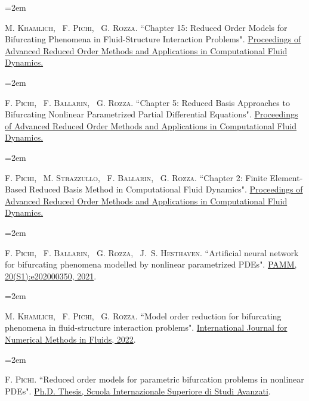 \documentclass{scrartcl}
\newcommand{\MarginText}[1]{\marginpar{\raggedleft\itshape\small#1}} %
\newlength{\datebox}\settowidth{\datebox}{Spring 2011} %
\newcommand{\NewEntry}[3]{\noindent\hangindent=2em\hangafter=0 \parbox{\datebox}{\small \textit{#1}}\hspace{1.5em} #2 #3 %
\vspace{0.5em}} %
\newcommand{\Description}[1]{\hangindent=2em\hangafter=0\noindent\raggedright\footnotesize{#1}\par\normalsize\vspace{1em}} %
\begin{document}
\begin{cv}{}
\Description{\MarginText{[11]}M. \textsc{Khamlich}, ~F. \textsc{Pichi}, ~G. \textsc{Rozza.} {\color{blue} ``Chapter 15: Reduced Order Models for Bifurcating Phenomena in Fluid-Structure Interaction Problems".} \href{https://epubs.siam.org/doi/10.1137/1.9781611977257.ch15}{Proceedings of Advanced Reduced Order Methods and Applications in Computational Fluid Dynamics.}}

\Description{\MarginText{[10]}F. \textsc{Pichi}, ~F. \textsc{Ballarin}, ~G. \textsc{Rozza.} {\color{blue} ``Chapter 5: Reduced Basis Approaches to Bifurcating Nonlinear Parametrized Partial Differential Equations".} \href{https://epubs.siam.org/doi/10.1137/1.9781611977257.ch5}{Proceedings of Advanced Reduced Order Methods and Applications in Computational Fluid Dynamics.}}

\newpage
\Description{\MarginText{[9]}F. \textsc{Pichi}, ~M. \textsc{Strazzullo}, ~F. \textsc{Ballarin}, ~G. \textsc{Rozza.} {\color{blue} ``Chapter 2: Finite Element-Based Reduced Basis Method in Computational Fluid Dynamics".} \href{https://epubs.siam.org/doi/10.1137/1.9781611977257.ch2}{Proceedings of Advanced Reduced Order Methods and Applications in Computational Fluid Dynamics.}}


\Description{\MarginText{[8]}F. \textsc{Pichi}, ~F. \textsc{Ballarin}, ~G. \textsc{Rozza}, ~J.~S. \textsc{Hesthaven.} {\color{blue} ``Artificial neural network for bifurcating phenomena modelled by nonlinear parametrized PDEs".} \href{https://onlinelibrary.wiley.com/doi/abs/10.1002/pamm.202000350}{PAMM, 20(S1):e202000350, 2021}.}

\Description{\MarginText{[7]}M. \textsc{Khamlich}, ~F. \textsc{Pichi}, ~G. \textsc{Rozza.} {\color{blue} ``Model order reduction for bifurcating phenomena in fluid-structure interaction problems".} \href{https://onlinelibrary.wiley.com/doi/abs/10.1002/fld.5118}{International Journal for Numerical Methods in Fluids, 2022}.}




\Description{\MarginText{[6]}F. \textsc{Pichi.} {\color{blue} ``Reduced order models for parametric bifurcation
problems in nonlinear {PDE}s".} \href{https://iris.sissa.it/handle/20.500.11767/114329}{Ph.D. Thesis, Scuola Internazionale Superiore di Studi Avanzati}.}




\end{cv}
\end{document}

